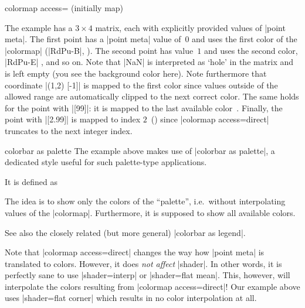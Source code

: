 \begin{pgfplotskey}{colormap access= (initially map)}
\begin{codeexample}[]
\end{codeexample}
	The example has a $3\times 4$ matrix, each with explicitly provided values of |point meta|. The first point has a |point meta| value of~$0$ and uses the first color of the |colormap| (|RdPu-B|, ). The second point has value~$1$ and uses the second color, |RdPu-E| , and so on. Note that |NaN| is interpreted as `hole' in the matrix and is left empty (you see the background color here). Note furthermore that coordinate |(1,2) [-1]| is mapped to the first color since values outside of the allowed range are automatically clipped to the next correct color. The same holds for the point with |[99]|: it is mapped to the last available color~. Finally, the point with |[2.99]| is mapped to index $2$~() since |colormap access=direct| truncates to the next integer index.

\begin{pgfplotskey}{colorbar as palette}
	The example above makes use of |colorbar as palette|, a dedicated style useful for such palette-type applications.

	It is defined as
\begin{codeexample}
\end{codeexample}
	The idea is to show only the colors of the ``palette'', i.e.\ without interpolating values of the |colormap|. Furthermore, it is supposed to show all available colors.

	See also the closely related (but more general) |colorbar as legend|.
\end{pgfplotskey}

	Note that |colormap access=direct| changes the way how |point meta| is translated to colors. However, it does \emph{not affect} |shader|. In other words, it is perfectly sane to use |shader=interp| or |shader=flat mean|. This, however, will interpolate the colors resulting from |colormap access=direct|! Our example above uses |shader=flat corner| which results in no color interpolation at all.


\end{pgfplotskey}
